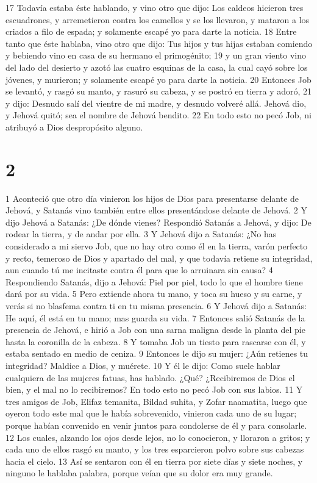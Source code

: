 17 Todavía estaba éste hablando, y vino otro que dijo: Los caldeos hicieron tres escuadrones, y arremetieron contra los camellos y se los llevaron, y mataron a los criados a filo de espada; y solamente escapé yo para darte la noticia.
18 Entre tanto que éste hablaba, vino otro que dijo: Tus hijos y tus hijas estaban comiendo y bebiendo vino en casa de su hermano el primogénito;
19 y un gran viento vino del lado del desierto y azotó las cuatro esquinas de la casa, la cual cayó sobre los jóvenes, y murieron; y solamente escapé yo para darte la noticia.
20 Entonces Job se levantó, y rasgó su manto, y rasuró su cabeza, y se postró en tierra y adoró,
21 y dijo: Desnudo salí del vientre de mi madre, y desnudo volveré allá. Jehová dio, y Jehová quitó; sea el nombre de Jehová bendito.
22 En todo esto no pecó Job, ni atribuyó a Dios despropósito alguno.

\chapter{2}

1 Aconteció que otro día vinieron los hijos de Dios para presentarse delante de Jehová, y Satanás vino también entre ellos presentándose delante de Jehová.
2 Y dijo Jehová a Satanás: ¿De dónde vienes? Respondió Satanás a Jehová, y dijo: De rodear la tierra, y de andar por ella.
3 Y Jehová dijo a Satanás: ¿No has considerado a mi siervo Job, que no hay otro como él en la tierra, varón perfecto y recto, temeroso de Dios y apartado del mal, y que todavía retiene su integridad, aun cuando tú me incitaste contra él para que lo arruinara sin causa?
4 Respondiendo Satanás, dijo a Jehová: Piel por piel, todo lo que el hombre tiene dará por su vida.
5 Pero extiende ahora tu mano, y toca su hueso y su carne, y verás si no blasfema contra ti en tu misma presencia.
6 Y Jehová dijo a Satanás: He aquí, él está en tu mano; mas guarda su vida.
7 Entonces salió Satanás de la presencia de Jehová, e hirió a Job con una sarna maligna desde la planta del pie hasta la coronilla de la cabeza.
8 Y tomaba Job un tiesto para rascarse con él, y estaba sentado en medio de ceniza.
9 Entonces le dijo su mujer: ¿Aún retienes tu integridad? Maldice a Dios, y muérete.
10 Y él le dijo: Como suele hablar cualquiera de las mujeres fatuas, has hablado. ¿Qué? ¿Recibiremos de Dios el bien, y el mal no lo recibiremos? En todo esto no pecó Job con sus labios.
11 Y tres amigos de Job, Elifaz temanita, Bildad suhita, y Zofar naamatita, luego que oyeron todo este mal que le había sobrevenido, vinieron cada uno de su lugar; porque habían convenido en venir juntos para condolerse de él y para consolarle.
12 Los cuales, alzando los ojos desde lejos, no lo conocieron, y lloraron a gritos; y cada uno de ellos rasgó su manto, y los tres esparcieron polvo sobre sus cabezas hacia el cielo.
13 Así se sentaron con él en tierra por siete días y siete noches, y ninguno le hablaba palabra, porque veían que su dolor era muy grande.

